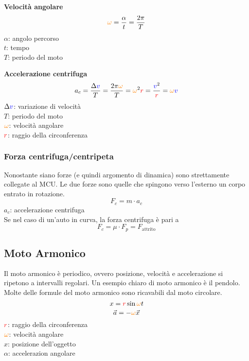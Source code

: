 \textbf{Velocità angolare}
\begin{equation*}
\mathcolor{orange}{\omega} = \frac{\alpha}{t} = \frac{2\pi}{T}
\end{equation*}
$\alpha$: angolo percorso\\ 
$t$: tempo\\
$T$: periodo del moto

\textbf{Accelerazione centrifuga}
\begin{equation*}
a_c = \frac{\Delta \mathcolor{blue}{v}}{T} = \frac{2\pi\mathcolor{orange}{\omega}}{T} = 
\mathcolor{orange}{\omega}^2\mathcolor{red}{r} = \frac{\mathcolor{blue}{v}^2}{\mathcolor{red}{r}} = 
\mathcolor{orange}{\omega}\mathcolor{blue}{v}
\end{equation*}
$\Delta\mathcolor{blue}{v}$: variazione di velocità\\
$T$: periodo del moto\\
$\mathcolor{orange}{\omega}$: velocità angolare\\
$\mathcolor{red}{r}$: raggio della circonferenza

\subsubsection{Forza centrifuga/centripeta}
Nonostante siano forze (e quindi argomento di dinamica) sono strettamente collegate al MCU. Le due 
forze sono quelle che spingono verso l'esterno un corpo entrato in rotazione.
\begin{equation*}
F_c = m\cdot a_c
\end{equation*}
$a_c$: accelerazione centrifuga\\[\baselineskip]
Se nel caso di un'auto in curva, la forza centrifuga è pari a
\begin{equation*}
F_c = \mu\cdot F_p = F_{\text{attrito}}
\end{equation*}

\subsection{Moto Armonico}
Il moto armonico è periodico, ovvero posizione, velocità e accelerazione si ripetono a intervalli 
regolari. Un esempio chiaro di moto armonico è il pendolo.\\
Molte delle formule del moto armonico sono ricavabili dal moto circolare.
\begin{equation*}
x = \mathcolor{red}{r}\sin\mathcolor{orange}{\omega}t
\end{equation*}
\begin{equation*}
\vec{a} = -\mathcolor{orange}{\omega}\vec{x}
\end{equation*}
$\mathcolor{red}{r}$: raggio della circonferenza\\
$\mathcolor{orange}{\omega}$: velocità angolare\\
$x$: posizione dell'oggetto\\
$\alpha$: accelerazion angolare

